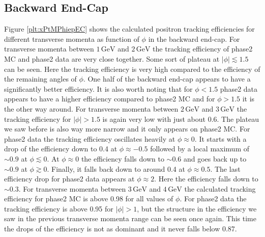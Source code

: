 \documentclass[a4paper,11pt,twosided,final,german,openbib,pdftex,listof=totoc,bibliography=totoc]{scrbook}
\begin{document}
\newpage

\subsection{Backward End-Cap}

Figure \ref{plt:xPtMPhiepEC} shows the calculated positron tracking efficiencies for different transverse momenta as function of $\phi$ in the backward end-cap. 
For transverse momenta between $1\,\textrm{GeV}$ and $2\,\textrm{GeV}$ the tracking efficiency of phase2 MC and phase2 data are very close together. Some sort of plateau at $|\phi| \lesssim 1.5$ can be seen. Here the tracking efficiency is very high compared to the efficiency of the remaining angles of $\phi$. One half of the backward end-cap appears to have a significantly better efficiency. It is also worth noting that for $\phi <1.5$ phase2 data appears to have a higher efficiency compared to phase2 MC and for $\phi > 1.5$ it is the other way around. 
For transverse momenta between $2\,\textrm{GeV}$ and $3\,\textrm{GeV}$ the tracking efficiency for $|\phi| >1.5$ is again very low with just about 0.6. The plateau we saw before is also way more narrow and it only appears on phase2 MC. For phase2 data the tracking efficiency oscillates heavily at $\phi \approx 0$. It starts with a drop of the efficiency down to 0.4 at $\phi \approx -0.5$ followed by a local maximum of $\sim 0.9$ at $\phi \lesssim 0$. At $\phi \approx 0 $ the efficiency falls down to $\sim 0.6$ and goes back up to $\sim 0.9$ at $\phi \gtrsim 0$. Finally, it falls back down to around 0.4 at $\phi \approx 0.5$. The last efficiency drop for phase2 data appears at $\phi \approx 2$. Here the efficiency falls down to $\sim 0.3$. 
For transverse momenta between $3\,\textrm{GeV}$ and $4\,\textrm{GeV}$ the calculated tracking efficiency for phase2 MC is above 0.98 for all values of $\phi$. For phase2 data the tracking efficiency is above 0.95 for $|\phi| > 1$, but the structure in the efficiency we saw in the previous transverse momenta range can be seen once again. This time the drops of the efficiency is not as dominant and it never falls below 0.87.
\end{document}
